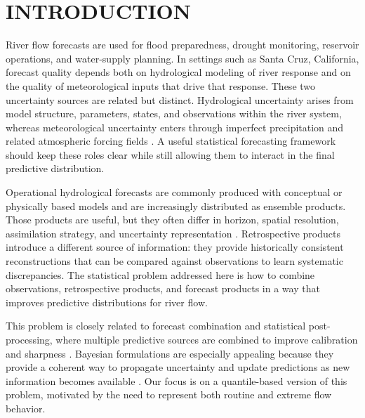 \documentclass[APA,STIX1COL]{WileyNJD-v2}
\begin{document}
\section{INTRODUCTION}

River flow forecasts are used for flood preparedness, drought monitoring, reservoir operations, and water-supply planning. In settings such as Santa Cruz, California, forecast quality depends both on hydrological modeling of river response and on the quality of meteorological inputs that drive that response. These two uncertainty sources are related but distinct. Hydrological uncertainty arises from model structure, parameters, states, and observations within the river system, whereas meteorological uncertainty enters through imperfect precipitation and related atmospheric forcing fields \citep{tarek2021daily, thiboult2016accounting, kim2019hybrid, haiden2021evaluation}. A useful statistical forecasting framework should keep these roles clear while still allowing them to interact in the final predictive distribution.

Operational hydrological forecasts are commonly produced with conceptual or physically based models and are increasingly distributed as ensemble products. Those products are useful, but they often differ in horizon, spatial resolution, assimilation strategy, and uncertainty representation \citep{molteni1996ecmwf, isaksen2010ensemble, demargne2013science, barlage2021importance, johnson2023comprehensive}. Retrospective products introduce a different source of information: they provide historically consistent reconstructions that can be compared against observations to learn systematic discrepancies. The statistical problem addressed here is how to combine observations, retrospective products, and forecast products in a way that improves predictive distributions for river flow.

This problem is closely related to forecast combination and statistical post-processing, where multiple predictive sources are combined to improve calibration and sharpness \citep{siegert2019forecast, vannitsem, wang2022forecastcombinations50yearreview}. Bayesian formulations are especially appealing because they provide a coherent way to propagate uncertainty and update predictions as new information becomes available \citep{duan2006bma, yumnam2022quantile, aastveit2022quantifying, du2018ensemble_forecasting, doubleday, kleiber2011geostatistical, mcalinn2019dynamic, tallman2023bayesianpredictivedecisionsynthesis, johnson2023bayesian}. Our focus is on a quantile-based version of this problem, motivated by the need to represent both routine and extreme flow behavior.
\end{document}

